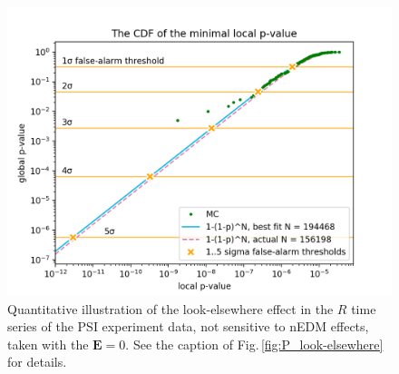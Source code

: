 \begin{figure}[h!]
  \centering
  \includegraphics[width=0.9\linewidth]{gfx/axions/E0_look-elsewhere.png}
  \caption{Quantitative illustration of the look-elsewhere effect in the $R$ time series of the PSI experiment data, not sensitive to nEDM effects, taken with the $\mathbf{E} = 0$. See the caption of Fig.\,\ref{fig:P_look-elsewhere} for details.}\label{fig:app_E0_look_elsewhere}
\end{figure}




